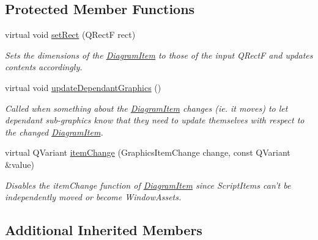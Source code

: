 \subsection*{Protected Member Functions}
\begin{DoxyCompactItemize}
\item 
\hypertarget{class_script_item_a77658955ab65d1ec0a7bf7a3755ee196}{virtual void \hyperlink{class_script_item_a77658955ab65d1ec0a7bf7a3755ee196}{set\-Rect} (Q\-Rect\-F rect)}\label{class_script_item_a77658955ab65d1ec0a7bf7a3755ee196}

\begin{DoxyCompactList}\small\item\em Sets the dimensions of the \hyperlink{class_diagram_item}{Diagram\-Item} to those of the input Q\-Rect\-F and updates contents accordingly. \end{DoxyCompactList}\item 
\hypertarget{class_script_item_aba8f8852f4fd19530d6b686193d87919}{virtual void \hyperlink{class_script_item_aba8f8852f4fd19530d6b686193d87919}{update\-Dependant\-Graphics} ()}\label{class_script_item_aba8f8852f4fd19530d6b686193d87919}

\begin{DoxyCompactList}\small\item\em Called when something about the \hyperlink{class_diagram_item}{Diagram\-Item} changes (ie. it moves) to let dependant sub-\/graphics know that they need to update themselves with respect to the changed \hyperlink{class_diagram_item}{Diagram\-Item}. \end{DoxyCompactList}\item 
\hypertarget{class_script_item_a828c7408cb2afaabd5a7c040207e7139}{virtual Q\-Variant \hyperlink{class_script_item_a828c7408cb2afaabd5a7c040207e7139}{item\-Change} (Graphics\-Item\-Change change, const Q\-Variant \&value)}\label{class_script_item_a828c7408cb2afaabd5a7c040207e7139}

\begin{DoxyCompactList}\small\item\em Disables the item\-Change function of \hyperlink{class_diagram_item}{Diagram\-Item} since Script\-Items can't be independently moved or become Window\-Assets. \end{DoxyCompactList}\end{DoxyCompactItemize}
\subsection*{Additional Inherited Members}



